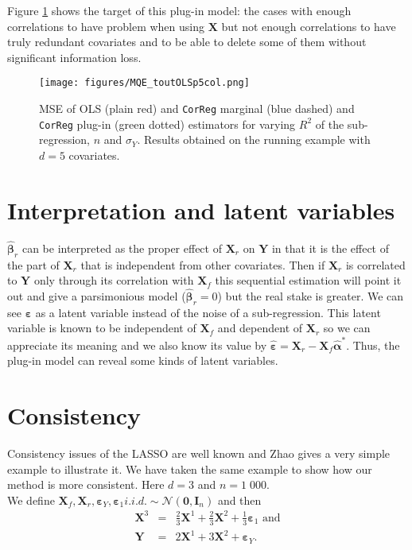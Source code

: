 \documentclass[12pt,a4paper]{report}
\begin{document}
	Figure \ref{MQE2} shows the target of this plug-in model: the cases with enough correlations to have problem when using $\boldsymbol{X}$	but not enough correlations to have truly redundant covariates and to be able to delete some of them without significant information loss.
\begin{figure}[h!]
	\texttt{[image: figures/MQE\_toutOLSp5col.png]}
	\caption{MSE of OLS (plain red) and {\tt CorReg} marginal (blue dashed) and {\tt CorReg} plug-in (green dotted) estimators for varying $R^2$ of the sub-regression, $n$ and $\sigma_Y$. Results obtained on the running example with $d=5$ covariates.}\label{MQE2}
\end{figure}	
			
		
	\section{Interpretation and latent variables}
			$\hat{\boldsymbol{\beta}}_{r}$ can be interpreted as the proper effect of $\boldsymbol{X}_r$ on $\boldsymbol{Y}$ in that it is the effect of the part of $\boldsymbol{X}_r$ that is independent from other covariates. Then if $\boldsymbol{X}_r$ is correlated to $\boldsymbol{Y}$ only through its correlation with $\boldsymbol{X}_f$ this sequential estimation will point it out and give a parsimonious model ($\hat{\boldsymbol{\beta}}_r=0$) but the real stake is greater. We can see $\boldsymbol{\varepsilon}$ as a latent variable instead of the noise of a sub-regression. This latent variable is known to be independent of $\boldsymbol{X}_f$ and dependent of $\boldsymbol{X}_r$ so we can appreciate its meaning and we also know its value by $\hat{\boldsymbol{\varepsilon}}=\boldsymbol{X}_r-\boldsymbol{X}_f\hat{\boldsymbol{\alpha}}^*$. Thus, the plug-in model can reveal some kinds of latent variables.
			
	

	\section{Consistency}\label{consistency}
		Consistency issues of the LASSO are well known and Zhao \cite{Zhao2006MSC} gives a very simple example to illustrate it.
		We have taken the same example to show how our method is more consistent.
		Here $d=3$ and $n=1\;000$.\\
		We define $\boldsymbol{X}_{f}, \boldsymbol{X}_{r}, \boldsymbol{\varepsilon}_Y, \boldsymbol{\varepsilon}_{1} i.i.d. \sim \mathcal{N}(\boldsymbol{0},\boldsymbol{I}_n)$ and then \\
		\begin{eqnarray}
		\boldsymbol{X}^3&=&\frac{2}{3}\boldsymbol{X}^1+\frac{2}{3}\boldsymbol{X}^2+\frac{1}{3}\boldsymbol{\varepsilon}_1 \textrm{ and} \\
		\boldsymbol{Y}&=&2\boldsymbol{X}^1+3\boldsymbol{X}^2+\boldsymbol{\varepsilon}_Y.
		\end{eqnarray}
		
\end{document}
